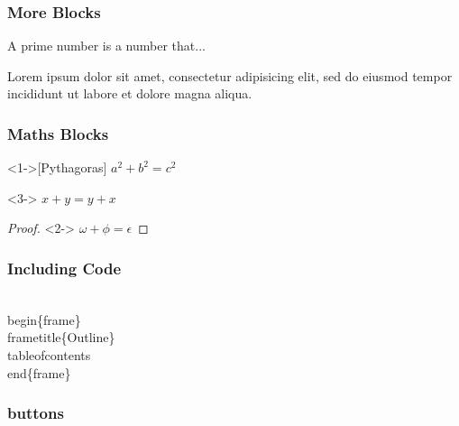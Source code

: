 \documentclass{beamer}
\begin{document}
\begin{frame}
\frametitle{More Blocks}
\begin{definition}
A prime number is a number that...
\end{definition}
\begin{example}
Lorem ipsum dolor sit amet, consectetur adipisicing elit, sed do eiusmod tempor incididunt ut labore et dolore magna aliqua.
\end{example}
\end{frame}

\begin{frame}
\frametitle{Maths Blocks}
\begin{theorem}<1->[Pythagoras]
$ a^2 + b^2 = c^2$
\end{theorem}
\begin{corollary}<3->
$ x + y = y + x  $
\end{corollary}
\begin{proof}<2->
$\omega +\phi = \epsilon $
\end{proof}
\end{frame}

\begin{frame}[fragile]
\frametitle{Including Code}
\begin{semiverbatim}
\\begin\{frame\}
\\frametitle\{Outline\}
\\tableofcontents
\\end\{frame\}
\end{semiverbatim}
\end{frame}

\begin{frame}
\frametitle{buttons}
\hyperlink{contents}{}

\hyperlink{columns}{}

\hyperlink{pictures}{}

\hyperlink{pictures}{}
\end{frame}
\end{document}
